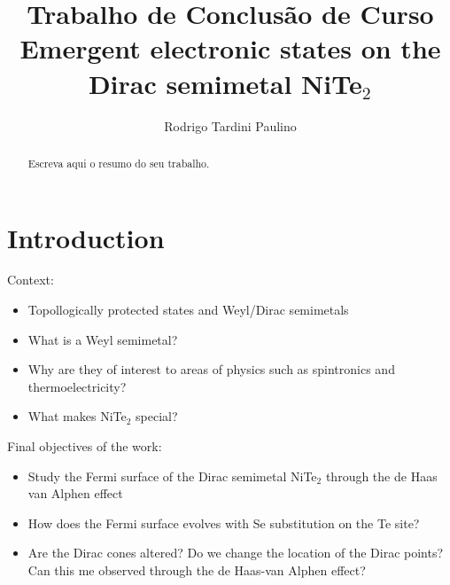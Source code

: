 \documentclass[prd,amsfonts,onecolumn,superscriptaddress,aps,nofootinbib,11pt]{revtex4}
\begin{document}
\title{{\Large{Trabalho de Conclusão de Curso}}\\ \vspace{0.6 cm}  \large{Emergent electronic states on the Dirac semimetal NiTe$_2$}}


\author{Rodrigo Tardini Paulino}




\begin{abstract}
Escreva aqui o resumo do seu trabalho.   
\end{abstract}
\maketitle


\section{Introduction} 
\label{sec:intro}


Context:
\begin{itemize}
    \item Topollogically protected states and Weyl/Dirac semimetals
    \item What is a Weyl semimetal?
    \item Why are they of interest to areas of physics such as spintronics and thermoelectricity?
    \item What makes NiTe$_2$ special?
\end{itemize}


Final objectives of the work:
\begin{itemize}
    \item Study the Fermi surface of the Dirac semimetal NiTe$_2$ through the de Haas van Alphen effect
    \item How does the Fermi surface evolves with Se substitution on the Te site?
    \item Are the Dirac cones altered? Do we change the location of the Dirac points? Can this me observed through the de Haas-van Alphen effect?
\end{itemize}
\end{document}
